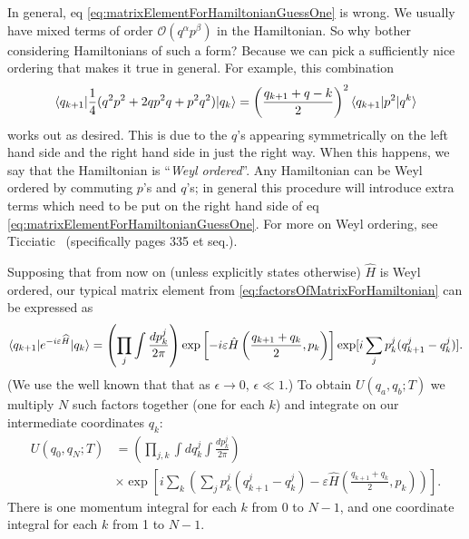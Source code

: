 In general, eq \eqref{eq:matrixElementForHamiltonianGuessOne} is
wrong. We usually have mixed terms of order
$\mathcal{O}(q^{\alpha}p^{\beta})$ in the Hamiltonian. So why
bother considering Hamiltonians of such a form? Because we can
pick a sufficiently nice ordering that makes it true in
general. For example, this combination
\begin{equation}%
\<q_{k+1}|\frac{1}{4}(q^{2}p^{2}+2qp^{2}q+p^{2}q^{2})|q_{k}\>=\left(\frac{q_{k+1}+q-{k}}{2}\right)^{2}\<q_{k+1}|p^{2}|q^{k}\>
\end{equation}
works out as desired. This is due to the $q$'s appearing
symmetrically on the left hand side and the right hand side in
just the right way. When this happens, we say that the
Hamiltonian is ``\emph{Weyl ordered}''. Any
Hamiltonian can be Weyl ordered by commuting $p$'s and $q$'s; in
general this procedure will introduce extra terms which need to
be put on the right hand side of eq \eqref{eq:matrixElementForHamiltonianGuessOne}.
For more on Weyl ordering, see Ticciatic~\cite{Ticciati:1999qp}
(specifically pages 335 et seq.).

Supposing that from now on (unless explicitly states otherwise)
$\hat{H}$ is Weyl ordered, our typical matrix element from \eqref{eq:factorsOfMatrixForHamiltonian}
can be expressed as
\begin{equation}%
\<q_{k+1}|e^{-i\varepsilon\widehat{H}}|q_{k}\> = \left(\prod_{j}\int\frac{dp^{j}_{k}}{2\pi}\right)\exp\left[-i\varepsilon\hat{H}\left(\frac{q_{k+1}+q_{k}}{2},p_{k}\right)\right]\exp[i\sum_{j}p^{j}_{k}(q^{j}_{k+1}-q^{j}_{k})].
\end{equation}
(We use the well known that that as $\epsilon\to0$,
$\epsilon\ll1$.) To obtain $U(q_a,q_b;T)$ we multiply $N$ such
factors together (one for each $k$) and integrate on our
intermediate coordinates $q_{k}$:
\begin{equation}%
\begin{split}
U(q_0,q_N;T) &= \left(\prod_{j,k}\int
dq^{j}_{k}\int\frac{dp^{j}_{k}}{2\pi}\right)\\
&\times\exp\left[i\sum_{k}\left(\sum_{j}p^{j}_{k}(q^{j}_{k+1}-q^{j}_{k})-\varepsilon\hat{H}(\frac{q_{k+1}+q_{k}}{2},p_{k})\right)\right].
\end{split}
\end{equation}
There is one momentum integral for each $k$ from 0 to $N-1$, and
one coordinate integral for each $k$ from 1 to $N-1$.

